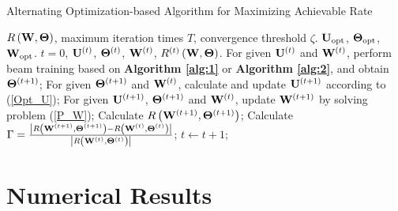 \documentclass[lettersize, journal]{IEEEtran}
\begin{document}
\begin{algorithm}[!t]
\caption{ Alternating Optimization-based Algorithm for Maximizing Achievable Rate }
\label{alg:3}
\begin{algorithmic}[1]
\REQUIRE $R \left( {\bf{W}}, {\bf{\Theta }} \right)$, maximum iteration times ${T}$, convergence threshold ${\zeta}$.
\ENSURE ${{\bf{U}}_{\rm{opt}}}$, ${{\bf{\Theta}}_{\rm{opt}}}$, ${{\bf{W}}_{\rm{opt}}}$.
 $ t = 0 $, ${{\bf{U}}^{\left( t \right)}}$, ${{\bf{\Theta}}^{\left( t \right)}}$, ${{\bf{W}}^{\left( t \right)}}$, $R^{\left( {t } \right)} \left( {\bf{W}}, {\bf{\Theta }} \right)$.
\STATE  For given ${{\bf{U}}^{\left( {t } \right)}}$ and ${{\bf{W}}^{\left( {t } \right)}}$, perform beam training based on {\bf Algorithm {\ref{alg:1}}} or {\bf Algorithm {\ref{alg:2}}}, and obtain ${{\bf{\Theta}}^{\left( {t + 1} \right)}}$;
\STATE  For given ${{\bf{\Theta}}^{\left( t+1 \right)}}$ and ${{\bf{W}}^{\left( t \right)}}$, calculate and update ${{\bf{U}}^{\left( {t + 1} \right)}}$ according to (\ref{Opt_U});
\STATE  For given ${{\bf{U}}^{\left( {t + 1} \right)}}$, ${{\bf{\Theta}}^{\left( t+1 \right)}}$ and ${{\bf{W}}^{\left( t \right)}}$, update ${{\bf{W}}^{\left( {t + 1} \right)}}$ by solving problem (\ref{P_W});
\STATE Calculate ${ R \left( {\bf{W}}^{\left( {t + 1} \right)}, {\bf{\Theta }}^{\left( {t + 1} \right)} \right) }$;
\STATE Calculate $ \Gamma  = \frac{ {\left| R \left( {\bf{W}}^{\left( {t + 1} \right)}, {\bf{\Theta }}^{\left( {t + 1} \right)} \right) - R \left( {\bf{W}}^{\left( {t} \right)}, {\bf{\Theta }}^{\left( {t} \right)} \right) \right|} } {{\left| R \left( {\bf{W}}^{\left( {t } \right)}, {\bf{\Theta }}^{\left( {t } \right)} \right) \right|}} $;
\STATE  $t \leftarrow t + 1$;
\ENDWHILE
\end{algorithmic}
\end{algorithm}


\section{Numerical Results}
\end{document}
